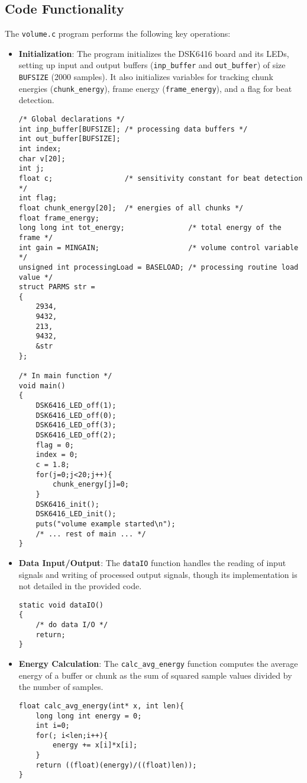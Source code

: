 \documentclass{article}
\begin{document}
\subsection*{Code Functionality}
The \texttt{volume.c} program performs the following key operations:
\begin{itemize}
    \item \textbf{Initialization}: The program initializes the DSK6416 board and its LEDs, setting up input and output buffers (\texttt{inp\_buffer} and \texttt{out\_buffer}) of size \texttt{BUFSIZE} (2000 samples). It also initializes variables for tracking chunk energies (\texttt{chunk\_energy}), frame energy (\texttt{frame\_energy}), and a flag for beat detection.
    \begin{lstlisting}[caption={Initialization Code in volume.c},label={lst:init}]
/* Global declarations */
int inp_buffer[BUFSIZE]; /* processing data buffers */
int out_buffer[BUFSIZE]; 
int index;
char v[20];
int j;
float c;                 /* sensitivity constant for beat detection */ 
int flag;
float chunk_energy[20];  /* energies of all chunks */
float frame_energy;
long long int tot_energy;               /* total energy of the frame */
int gain = MINGAIN;                     /* volume control variable */
unsigned int processingLoad = BASELOAD; /* processing routine load value */
struct PARMS str =
{
    2934,
    9432,
    213,
    9432,
    &str
};

/* In main function */
void main()
{
    DSK6416_LED_off(1);
    DSK6416_LED_off(0);
    DSK6416_LED_off(3);
    DSK6416_LED_off(2);
    flag = 0;
    index = 0;
    c = 1.8;
    for(j=0;j<20;j++){
        chunk_energy[j]=0;
    }
    DSK6416_init();
    DSK6416_LED_init();
    puts("volume example started\n");
    /* ... rest of main ... */
}
    \end{lstlisting}

    \item \textbf{Data Input/Output}: The \texttt{dataIO} function handles the reading of input signals and writing of processed output signals, though its implementation is not detailed in the provided code.
    \begin{lstlisting}[caption={Data Input/Output Code in volume.c},label={lst:dataio}]
static void dataIO()
{
    /* do data I/O */
    return;
}
    \end{lstlisting}

    \item \textbf{Energy Calculation}: The \texttt{calc\_avg\_energy} function computes the average energy of a buffer or chunk as the sum of squared sample values divided by the number of samples.
    \begin{lstlisting}[caption={Energy Calculation Code in volume.c},label={lst:energy}]
float calc_avg_energy(int* x, int len){
    long long int energy = 0;
    int i=0;
    for(; i<len;i++){
        energy += x[i]*x[i];
    }
    return ((float)(energy)/((float)len));
}
    \end{lstlisting}


\end{itemize}
\end{document}
